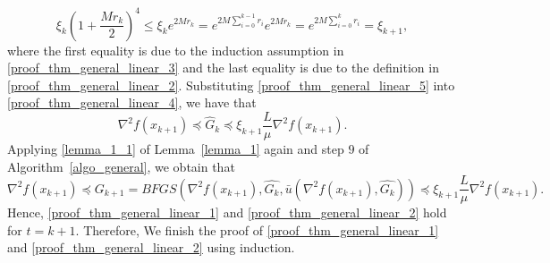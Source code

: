 \documentclass[11pt]{article}
\numberwithin{assumption}{section}
\numberwithin{remark}{section}
\numberwithin{theorem}{section}
\begin{document}
\begin{equation}\label{proof_thm_general_linear_5}
\xi_k (1 + \frac{Mr_k}{2})^4 \leq \xi_k e^{2Mr_k} = e^{2M\sum_{i = 0}^{k - 1}r_i}e^{2Mr_k} = e^{2M\sum_{i = 0}^{k}r_i} = \xi_{k + 1},
\end{equation}
where the first equality is due to the induction assumption in \eqref{proof_thm_general_linear_3} and the last equality is due to the definition in \eqref{proof_thm_general_linear_2}. Substituting \eqref{proof_thm_general_linear_5} into \eqref{proof_thm_general_linear_4}, we have that
\begin{equation}
    \nabla^2{f(x_{k + 1})} \preceq \hat{G}_k \preceq \xi_{k + 1} \frac{L}{\mu}\nabla^2{f(x_{k + 1})}.
\end{equation}
Applying \eqref{lemma_1_1} of Lemma~\ref{lemma_1} again and step $9$ of Algorithm~\ref{algo_general}, we obtain that
\begin{equation}
    \nabla^2{f(x_{k + 1})} \preceq G_{k + 1} = BFGS(\nabla^2{f(x_{k + 1})}, \hat{G_k}, \bar{u}(\nabla^2{f(x_{k + 1})}, \hat{G_k})) \preceq \xi_{k + 1} \frac{L}{\mu}\nabla^2{f(x_{k + 1})}.
\end{equation}
Hence, \eqref{proof_thm_general_linear_1} and \eqref{proof_thm_general_linear_2} hold for $t = k + 1$. Therefore, We finish the proof of \eqref{proof_thm_general_linear_1} and \eqref{proof_thm_general_linear_2} using induction.
\end{document}
